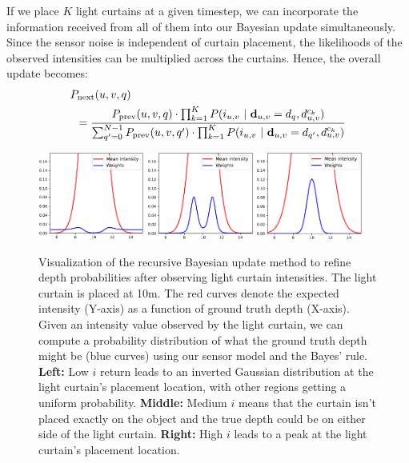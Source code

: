 If we place $K$ light curtains at a given timestep, we can incorporate the information received from all of them into our Bayesian update simultaneously. Since the sensor noise is independent of curtain placement, the likelihoods of the observed intensities can be multiplied across the curtains. Hence, the overall update becomes: 
\begin{align*}
   &\after{q} \\
   &\hspace{5pt}= \frac{\before{q} \cdot \prod_{k=1}^K P(i_{u, v}\ |\ \dd_{u, v} = d_q, d^{c_k}_{u, v})}{\sum_{\qb=0}^{N-1} \before{\qb} \cdot \prod_{k=1}^K P(i_{u, v}\ |\ \dd_{u, v} = d_{\qb}, d^{c_k}_{u, v})}
\end{align*} 

\begin{figure}[h]
   \centering
   \begin{minipage}{0.5\textwidth}
       \centering
       \includegraphics[width=0.31\textwidth]{figures/aa.pdf}
       \includegraphics[width=0.31\textwidth]{figures/bb.pdf}
       \includegraphics[width=0.31\textwidth]{figures/cc.pdf}
   \end{minipage}\hfill
   \centering
   \caption{Visualization of the recursive Bayesian update method to refine depth probabilities after observing light curtain intensities. The light curtain is placed at 10m. The red curves denote the expected intensity (Y-axis) as a function of ground truth depth (X-axis). Given an intensity value observed by the light curtain, we can compute a probability distribution of what the ground truth depth might be (blue curves) using our sensor model and the Bayes' rule. \textbf{Left:} Low $i$ return leads to an inverted Gaussian distribution at the light curtain's placement location, with other regions getting a uniform probability. \textbf{Middle:} Medium $i$ means that the curtain isn't placed exactly on the object and the true depth could be on either side of the light curtain. \textbf{Right:} High $i$ leads to a peak at the light curtain's placement location.}
   \label{fig:updatemodel}
\end{figure}

